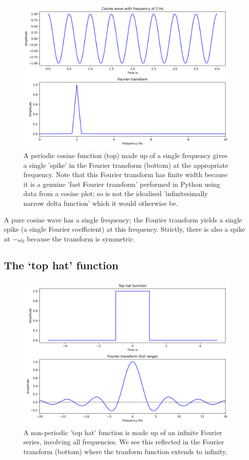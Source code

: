 \documentclass[
]{book}
\begin{document}
\begin{figure}

{\centering \includegraphics[width=0.7\linewidth]{visualisations/ch11-ftcosinefunction1} 

}

\caption{A periodic cosine function (top) made up of a single frequency gives a single 'spike' in the Fourier transform (bottom) at the appropriate frequency. Note that this Fourier transform has finite width because it is a genuine 'fast Fourier transform' performed in Python using data from a cosine plot; so is not the idealised 'infinitesimally narrow delta function' which it would otherwise be.}\label{fig:ch11-ftcosinefunction1}
\end{figure}

A pure cosine wave has a single frequency; the Fourier transform yields a single spike (a single Fourier coefficient) at this frequency. Strictly, there is also a spike at \(-\omega_0\) because the transform is symmetric.

\hypertarget{sec:ch11-fttophat}{%
\subsection{The `top hat' function}\label{sec:ch11-fttophat}}

\begin{figure}

{\centering \includegraphics[width=0.7\linewidth]{visualisations/ch11-fttophat1} 

}

\caption{A non-periodic 'top hat' function is made up of an infinite Fourier series, involving all frequencies. We see this reflected in the Fourier transform (bottom) where the tranform function extends to infinity.}\label{fig:ch11-fttophat1}
\end{figure}
\end{document}
